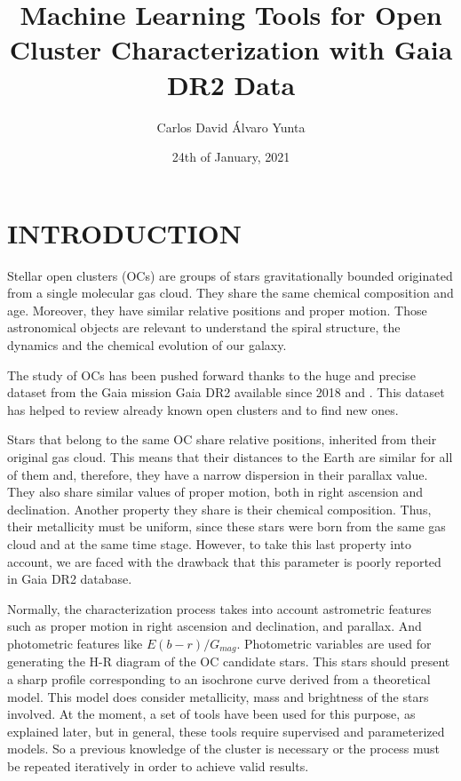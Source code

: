 \documentclass[11pt,a4paper,USenglish,twocolumn]{article}
\title{Machine Learning Tools for Open Cluster Characterization with Gaia DR2 Data}
\author{Carlos David Álvaro Yunta}
\date{24th of January, 2021}
\begin{document}
\twocolumn[
\begin{@twocolumnfalse}
\maketitle
\end{@twocolumnfalse}
]




\section{INTRODUCTION}

Stellar open clusters (OCs) \cite{janes1982open} are groups of stars
gravitationally bounded originated from a single molecular gas cloud.
They share the same chemical composition and age. Moreover,
they have similar relative positions and proper motion.
Those astronomical objects are relevant to understand the spiral structure,
the dynamics and the chemical evolution of our galaxy.

The study of OCs has been pushed forward thanks to the huge and precise dataset
from the Gaia mission Gaia DR2 available since 2018
\cite{collaboration2016description} and \cite{gaia2018gaia}.
This dataset has helped to review already known open clusters and to find new ones.

Stars that belong to the same OC share relative positions,
inherited from their original gas cloud.
This means that their distances to the Earth are similar for all of them and,
therefore, they have a narrow dispersion in their parallax value.
They also share similar values of proper motion, both in right ascension and declination.
Another property they share is their chemical composition.
Thus, their metallicity must be uniform,
since these stars were born from the same gas cloud and at the same time stage.
However, to take this last property into account, we are faced with the drawback
that this parameter is poorly reported in Gaia DR2 database.

Normally, the characterization process takes into account astrometric features
such as proper motion in right ascension and declination, and parallax.
And photometric features like $E(b-r) / G_{mag}$.
Photometric variables are used for generating the H-R diagram of the OC candidate stars.
This stars should present a sharp profile corresponding to an isochrone curve derived
from a theoretical model.
This model does consider metallicity, mass and brightness of the stars involved.
At the moment, a set of tools have been used for this purpose, as explained later,
but in general, these tools require supervised and parameterized models.
So a previous knowledge of the cluster is necessary or the process must be repeated
iteratively in order to achieve valid results.
\end{document}
